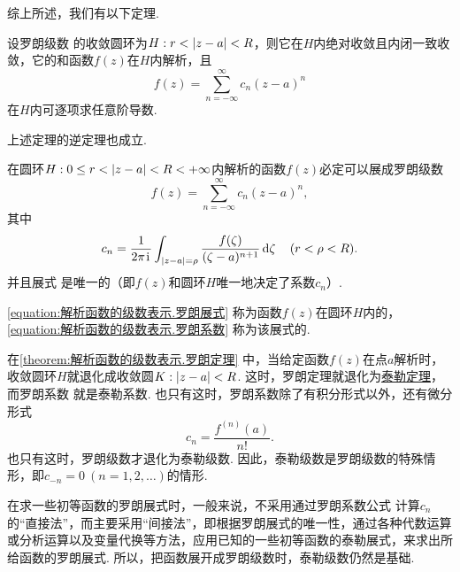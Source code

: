 综上所述，我们有以下定理.
\begin{theorem}
设罗朗级数  的收敛圆环为\(H: r < \abs{z-a} < R\)，则它在\(H\)内绝对收敛且内闭一致收敛，它的和函数\(f(z)\)在\(H\)内解析，且\[
f(z) = \sum_{n=-\infty}^\infty c_n (z-a)^n
\]在\(H\)内可逐项求任意阶导数.
\end{theorem}

上述定理的逆定理也成立.
\begin{theorem}[罗朗定理]\label{theorem:解析函数的级数表示.罗朗定理}
在圆环\(H: 0 \leq r < \abs{z-a} < R < +\infty\)内解析的函数\(f(z)\)必定可以展成罗朗级数\begin{equation}\label{equation:解析函数的级数表示.罗朗展式}
f(z) = \sum_{n=-\infty}^\infty c_n (z-a)^n,
\end{equation}其中\begin{equation}\label{equation:解析函数的级数表示.罗朗系数}
c_n = \frac{1}{2\pi\kern1pt\mathrm{i}\kern1pt} \int_{\abs{z-a}=\rho} \frac{f(\zeta)}{(\zeta-a)^{n+1}} \dd{\zeta}
\quad(r<\rho<R).
\end{equation}
并且展式  是唯一的（即\(f(z)\)和圆环\(H\)唯一地决定了系数\(c_n\)）.
\end{theorem}
\cref{equation:解析函数的级数表示.罗朗展式} 称为函数\(f(z)\)在圆环\(H\)内的，\cref{equation:解析函数的级数表示.罗朗系数} 称为该展式的.

在\cref{theorem:解析函数的级数表示.罗朗定理} 中，当给定函数\(f(z)\)在点\(a\)解析时，收敛圆环\(H\)就退化成收敛圆\(K: \abs{z-a}<R\).
这时，罗朗定理就退化为\hyperref[theorem:解析函数的级数表示.泰勒定理]{泰勒定理}，而罗朗系数  就是泰勒系数.
也只有这时，罗朗系数除了有积分形式以外，还有微分形式\[
c_n = \frac{f^{(n)}(a)}{n!}.
\]也只有这时，罗朗级数才退化为泰勒级数.
因此，泰勒级数是罗朗级数的特殊情形，即\(c_{-n} = 0\ (n=1,2,\dotsc)\)的情形.

在求一些初等函数的罗朗展式时，一般来说，不采用通过罗朗系数公式  计算\(c_n\)的“直接法”，而主要采用“间接法”，即根据罗朗展式的唯一性，通过各种代数运算或分析运算以及变量代换等方法，应用已知的一些初等函数的泰勒展式，来求出所给函数的罗朗展式.
所以，把函数展开成罗朗级数时，泰勒级数仍然是基础.

